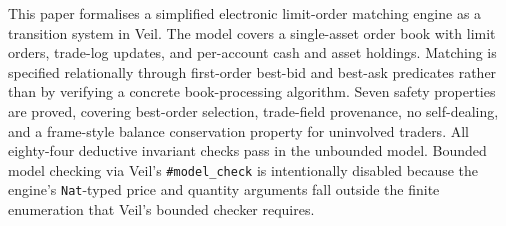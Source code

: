 This paper formalises a simplified electronic limit-order matching engine as a
transition system in Veil. The model covers a single-asset order book with
limit orders, trade-log updates, and per-account cash and asset holdings.
Matching is specified relationally through first-order best-bid and best-ask
predicates rather than by verifying a concrete book-processing algorithm.
Seven safety properties are proved, covering best-order selection, trade-field
provenance, no self-dealing, and a frame-style balance conservation property
for uninvolved traders. All eighty-four deductive invariant checks pass in the
unbounded model. Bounded model checking via Veil's \texttt{\#model\_check} is
intentionally disabled because the engine's \texttt{Nat}-typed price and
quantity arguments fall outside the finite enumeration that Veil's bounded
checker requires.
